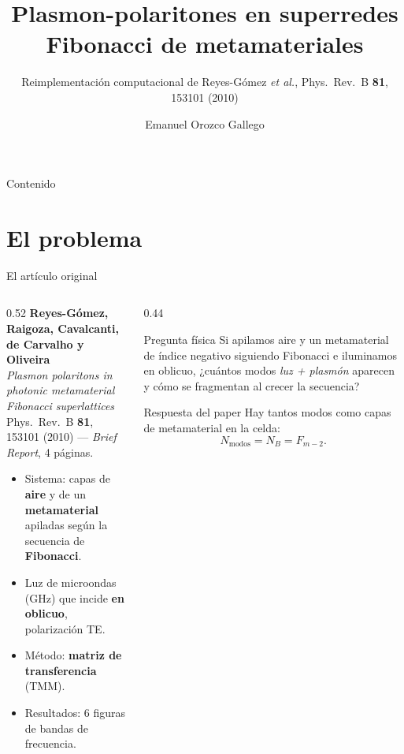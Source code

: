 \documentclass[aspectratio=169,10pt]{beamer}
\title{Plasmon-polaritones en superredes Fibonacci de metamateriales}
\subtitle{Reimplementación computacional de Reyes-Gómez \textit{et al.},
Phys.\ Rev.\ B \textbf{81}, 153101 (2010)}
\author{Emanuel Orozco Gallego}
\institute{Análisis Numérico}
\date{}
\begin{document}
\maketitle

\begin{frame}{Contenido}
  \tableofcontents[hideallsubsections]
\end{frame}

\section{El problema}

\begin{frame}{El artículo original}
  \small
  \begin{columns}[T]
    \begin{column}{0.52\textwidth}
      \textbf{Reyes-Gómez, Raigoza, Cavalcanti, de Carvalho y Oliveira}\\
      \textit{Plasmon polaritons in photonic metamaterial Fibonacci superlattices}\\
      Phys.\ Rev.\ B \textbf{81}, 153101 (2010) --- \textit{Brief Report}, 4 páginas.
      \vspace{0.6em}
      \begin{itemize}
        \item Sistema: capas de \textbf{aire} y de un \textbf{metamaterial} apiladas según la secuencia de \textbf{Fibonacci}.
        \item Luz de microondas (GHz) que incide \textbf{en oblicuo}, polarización TE.
        \item Método: \textbf{matriz de transferencia} (TMM).
        \item Resultados: 6 figuras de bandas de frecuencia.
      \end{itemize}
    \end{column}
    \begin{column}{0.44\textwidth}
      \begin{alertblock}{Pregunta física}
        Si apilamos aire y un metamaterial de índice negativo siguiendo Fibonacci
        e iluminamos en oblicuo, ¿cuántos modos \emph{luz + plasmón} aparecen y
        cómo se fragmentan al crecer la secuencia?
      \end{alertblock}
      \begin{exampleblock}{Respuesta del paper}
        Hay tantos modos como capas de metamaterial en la celda:
        \[ N_{\text{modos}} = N_B = F_{m-2}. \]
      \end{exampleblock}
    \end{column}
  \end{columns}
\end{frame}
\end{document}
